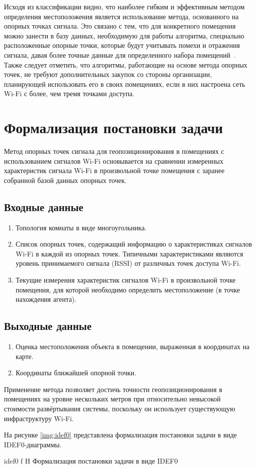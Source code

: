 Исходя из классификации видно, что наиболее гибким и эффективным методом определения местоположения является использование метода, основанного на опорных точках сигнала. Это связано с тем, что для конкретного помещения можно занести в базу данных, необходимую для работы алгоритма, специально расположенные опорные точки, которые будут учитывать помехи и отражения сигнала, давая более точные данные для определенного набора помещений~\cite{bag}. Также следует отметить, что алгоритмы, работающие на основе метода опорных точек, не требуют дополнительных закупок со стороны организации, планирующей использовать его в своих помещениях, если в них настроена сеть Wi-Fi с более, чем тремя точками доступа.

\section{Формализация постановки задачи}

Метод опорных точек сигнала для геопозиционирования в помещениях с использованием сигналов Wi-Fi основывается на сравнении измеренных характеристик сигнала Wi-Fi в произвольной точке помещения с заранее собранной базой данных опорных точек.

\subsection*{Входные данные}

\begin{enumerate}
    \item Топология комнаты в виде многоугольника.
    \item Список опорных точек, содержащий информацию о характеристиках сигналов Wi-Fi в каждой из опорных точек. Типичными характеристиками являются уровень принимаемого сигнала (RSSI) от различных точек доступа Wi-Fi.
    \item Текущие измерения характеристик сигналов Wi-Fi в произвольной точке помещения, для которой необходимо определить местоположение (в точке нахождения агента).
\end{enumerate}

\subsection*{Выходные данные}

\begin{enumerate}
    \item Оценка местоположения объекта в помещении, выраженная в координатах на карте.
    \item Координаты ближайшей опорной точки.
\end{enumerate}

Применение метода позволяет достичь точности геопозиционирования в помещениях на уровне нескольких метров при относительно невысокой стоимости развёртывания системы, поскольку он использует существующую инфраструктуру Wi-Fi.

\clearpage

На рисунке \ref{img:idef0} представлена формализация постановки задачи в виде IDEF0-диаграммы.

    {idef0}
    {f}
    {H}
    {\linewidth}
    {Формализация постановки задачи в виде IDEF0}
